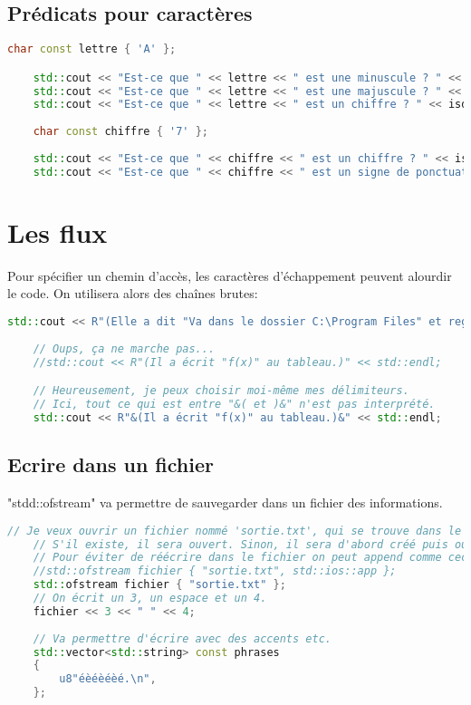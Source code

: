 \documentclass{article}
\begin{document}
\subsection{Prédicats pour caractères}
\begin{lstlisting}[language=C++]
    char const lettre { 'A' };

    std::cout << "Est-ce que " << lettre << " est une minuscule ? " << islower(lettre) << std::endl;
    std::cout << "Est-ce que " << lettre << " est une majuscule ? " << isupper(lettre) << std::endl;
    std::cout << "Est-ce que " << lettre << " est un chiffre ? " << isdigit(lettre) << std::endl;
    
    char const chiffre { '7' };
    
    std::cout << "Est-ce que " << chiffre << " est un chiffre ? " << isdigit(chiffre) << std::endl;
    std::cout << "Est-ce que " << chiffre << " est un signe de ponctuation ? " << ispunct(chiffre) << std::endl;
\end{lstlisting}{}


\section{Les flux}
Pour spécifier un chemin d'accès, les caractères d'échappement peuvent alourdir le code. On utilisera alors des chaînes brutes:
\begin{lstlisting}[language=C++]
    std::cout << R"(Elle a dit "Va dans le dossier C:\Program Files" et regarde.)" << std::endl;
    
    // Oups, ça ne marche pas...
    //std::cout << R"(Il a écrit "f(x)" au tableau.)" << std::endl;

    // Heureusement, je peux choisir moi-même mes délimiteurs.
    // Ici, tout ce qui est entre "&( et )&" n'est pas interprété.
    std::cout << R"&(Il a écrit "f(x)" au tableau.)&" << std::endl;
\end{lstlisting}{}

\subsection{Ecrire dans un fichier}
"stdd::ofstream" va permettre de sauvegarder dans un fichier des informations. 
\begin{lstlisting}[language=C++]
    // Je veux ouvrir un fichier nommé 'sortie.txt', qui se trouve dans le dossier du projet.
    // S'il existe, il sera ouvert. Sinon, il sera d'abord créé puis ouvert.
    // Pour éviter de réécrire dans le fichier on peut append comme ceci:
    //std::ofstream fichier { "sortie.txt", std::ios::app };
    std::ofstream fichier { "sortie.txt" };
    // On écrit un 3, un espace et un 4.
    fichier << 3 << " " << 4;
    
    // Va permettre d'écrire avec des accents etc. 
    std::vector<std::string> const phrases
    {
        u8"éèéèéèé.\n",
    };
\end{lstlisting}{}
\end{document}
